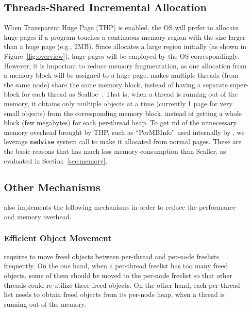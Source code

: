 \subsection{Threads-Shared Incremental Allocation} 
When Transparent Huge Page (THP) is enabled, the OS will prefer to allocate huge pages if a program touches a continuous memory region with the size larger than a huge page (e.g., 2MB). Since \NM{} allocates a large region initially (as shown in Figure~\ref{fig:overview}), huge pages will be employed by the OS correspondingly. However, it is important to reduce memory fragmentation, as one allocation from a memory block will be assigned to a huge page. \NM{} makes multiple threads (from the same node) share the same memory block, instead of having a separate super-block for each thread as Scalloc~\cite{Scalloc}. That is, when a thread is running out of the memory, it obtains only multiple objects at a time (currently 1 page for very small objects) from the corresponding memory block, instead of getting a whole block (few megabytes) for each per-thread heap. To get rid of the unnecessary memory overhead brought by THP, such as ``PerMBInfo'' used internally by \NM{}, we leverage \texttt{madvise} system call to make it allocated from normal pages.  These are the basic reasons that \NM{} has much less memory consumption than Scaller, as evaluated in Section~\ref{sec:memory}. 

\subsection{Other Mechanisms}
\label{sec:others}

\NM{} also implements the following mechanisms in order to reduce the performance and memory overhead. 


\subsubsection{Efficient Object Movement} 
\NM{} requires to move freed objects between per-thread and per-node freelists frequently. On the one hand, when a per-thread freelist has too many freed objects, some of them should be moved to the per-node freelist so that other threads could re-utilize these freed objects. On the other hand, each per-thread list needs to obtain freed objects from its per-node heap, when a thread is running out of the memory. 

